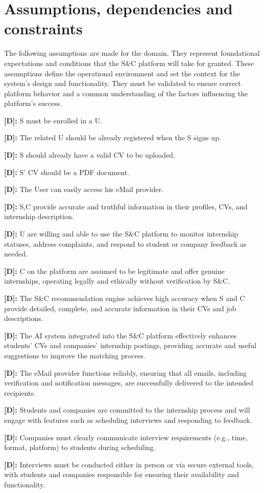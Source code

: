 \section{Assumptions, dependencies and constraints}
\label{sec:assumptions_dependencies_constraints}%

The following assumptions are made for the domain. They represent
foundational expectations and conditions that the S\&C platform will
take for granted. These assumptions define the operational environment
and set the context for the system's design and functionality. They must
be validated to ensure correct platform behavior and a common
understanding of the factors influencing the platform's success.

\setcounter{d}{1}
\newcommand{\cd}{\thed{}}

\textbf{[D\cd]:} S must be enrolled in a U.

\textbf{[D\cd]:} The related U should be already registered when the S signs up.

\textbf{[D\cd]:} S should already have a valid CV to be uploaded.

\textbf{[D\cd]:} S' CV should be a PDF document.

\textbf{[D\cd]:} The User can easily access his eMail provider.

\textbf{[D\cd]:} S,C provide accurate and truthful information in their
profiles, CVs, and internship description.

\textbf{[D\cd]:} U are willing and able to use the S\&C platform to monitor
internship statuses, address complaints, and respond to student or
company feedback as needed.

\textbf{[D\cd]:} C on the platform are assumed to be legitimate and offer
genuine internships, operating legally and ethically without
verification by S\&C.

\textbf{[D\cd]:} The S\&C recommendation engine achieves high accuracy when S
and C provide detailed, complete, and accurate information in their CVs
and job descriptions.

\textbf{[D\cd]:} The AI system integrated into the S\&C platform effectively
enhances students' CVs and companies' internship postings, 
providing accurate and useful suggestions to improve the matching process.

\textbf{[D\cd]:} The eMail provider functions reliably, ensuring that all
emails, including verification and notification messages, are
successfully delivered to the intended recipients.

\textbf{[D\cd]:} Students and companies are committed to the internship process
and will engage with features such as scheduling interviews and
responding to feedback.

\textbf{[D\cd]:} Companies must clearly communicate interview requirements
(e.g., time, format, platform) to students during scheduling.

\textbf{[D\cd]:} Interviews must be conducted either in person or via secure
external tools, with students and companies responsible for ensuring
their availability and functionality.